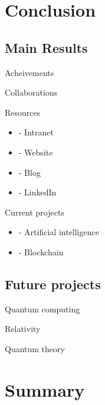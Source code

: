 \documentclass[8pt]{beamer}
\begin{document}
\section{Conclusion}

\subsection{Main Results}

\begin{frame}{Acheivements}
\end{frame}

\begin{frame}{Collaborations}
\end{frame}

\begin{frame}{Resources}
  \begin{itemize}
  \item
- Intranet
  \item
- Website
  \item
- Blog
  \item
- LinkedIn
  \end{itemize}
\end{frame}

\begin{frame}{Current projects}
  \begin{itemize}
  \item
- Artificial intelligence
  \item
- Blockchain
  \end{itemize}
\end{frame}


\subsection{Future projects}

\begin{frame}{Quantum computing}
\end{frame}

\begin{frame}{Relativity}
\end{frame}

\begin{frame}{Quantum theory}
\end{frame}



\section*{Summary}
\end{document}
